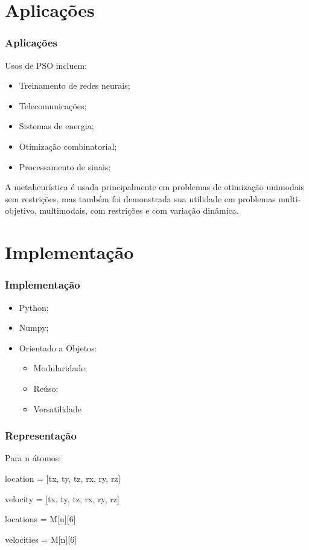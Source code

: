 \documentclass{beamer}
\begin{document}
\section{Aplicações}

\begin{frame}
\frametitle{Aplicações}
Usos de PSO incluem:
\begin{itemize}
\item Treinamento de redes neurais;
\item Telecomunicações;
\item Sistemas de energia;
\item Otimização combinatorial;
\item Processamento de sinais;
\end{itemize}
A metaheurística é usada principalmente em problemas de otimização unimodais sem restrições, mas também foi demonstrada sua utilidade em problemas multi-objetivo, multimodais, com restrições e com variação dinâmica. 
\end{frame}

\section{Implementação}

\begin{frame}
\frametitle{Implementação}
\begin{itemize}
\item Python;
\item Numpy;
\item Orientado a Objetos:
\begin{itemize}
\item Modularidade;
\item Reúso;
\item Versatilidade
\end{itemize}
\end{itemize}
\end{frame}

\begin{frame}
\frametitle{Representação}
Para n átomos:

location = [tx, ty, tz, rx, ry, rz]

velocity = [tx, ty, tz, rx, ry, rz]

locations = M[n][6]

velocities = M[n][6]
\end{frame}
\end{document}
